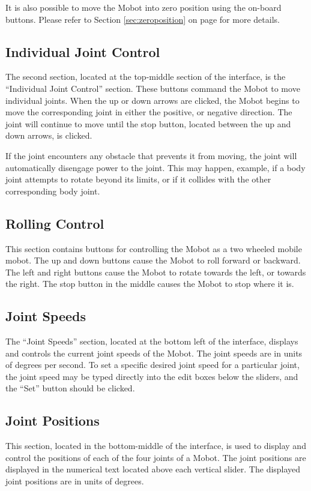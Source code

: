 \documentclass{article}
\begin{document}
It is also possible to move the Mobot into zero position using the
on-board buttons. Please refer to Section \ref{sec:zeroposition} on
page \pageref{sec:zeroposition} for more details.

\subsection{Individual Joint Control}
The second section, located at the top-middle section of the interface,
is the ``Individual Joint Control'' section. These buttons command the
Mobot to move individual joints. When the up or down arrows are clicked,
the Mobot begins to move the corresponding joint in either the positive,
or negative direction. The joint will continue to move until the stop 
button, located between the up and down arrows, is clicked. 

If the joint encounters any obstacle that prevents it from moving, the 
joint will automatically disengage power to the joint. This may happen, 
example, if a body joint attempts to rotate beyond its limits,
or if it collides with the other corresponding body joint. 

\subsection{Rolling Control}
This section contains buttons for controlling the Mobot as a 
two wheeled mobile mobot. The up and down buttons cause the Mobot to
roll forward or backward. The left and right buttons cause the Mobot 
to rotate towards the left, or towards the right. The stop button in the
middle causes the Mobot to stop where it is.

\subsection{Joint Speeds}
The ``Joint Speeds'' section, located at the bottom left of the interface,
displays and controls the current joint speeds of the Mobot.
The joint speeds are in units of degrees per second. To set a specific 
desired joint speed for a particular joint, the joint speed may be 
typed directly into the edit boxes below the sliders, and the ``Set''
button should be clicked.
 
\subsection{Joint Positions}
This section, located in the bottom-middle of the interface, is used to display
and control the positions of each of the four
joints of a Mobot. The joint positions are displayed in the numerical
text located above each vertical slider. The displayed joint positions are in
units of degrees.  
\end{document}
